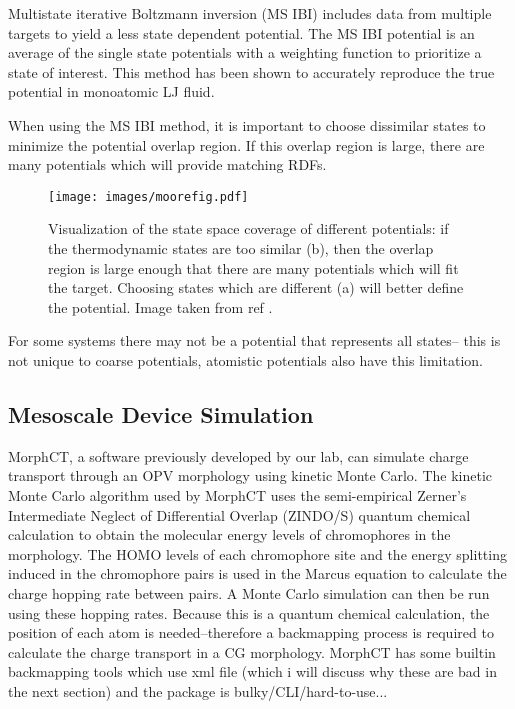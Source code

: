 Multistate iterative Boltzmann inversion (MS IBI) includes data from multiple targets to yield a less state dependent potential\cite{Moore2014}.
The MS IBI potential is an average of the single state potentials with a weighting function to prioritize a state of interest.
This method has been shown to accurately reproduce the true potential in monoatomic LJ fluid.

When using the MS IBI method, it is important to choose dissimilar states to minimize the potential overlap region.
If this overlap region is large, there are many potentials which will provide matching RDFs.

\begin{wrapfigure}{L}{0.5\linewidth}
    \centering
    \texttt{[image: images/moorefig.pdf]}
    \caption{Visualization of the state space coverage of different potentials: if the thermodynamic states are too similar (b), then the overlap region is large enough that there are many potentials which will fit the target. Choosing states which are different (a) will better define the potential. Image taken from ref \cite{Moore2014}.}
    \label{fig:lj}
\end{wrapfigure}

For some systems there may not be a potential that represents all states-- this is not unique to coarse potentials, atomistic potentials also have this limitation.

\subsection*{Mesoscale Device Simulation}

MorphCT, a software previously developed by our lab, can simulate charge transport through an OPV morphology using kinetic Monte Carlo\cite{Miller2018a,MorphCT,morphct2.2}.
The kinetic Monte Carlo algorithm used by MorphCT uses the semi-empirical Zerner's Intermediate Neglect of Differential Overlap (ZINDO/S) quantum chemical calculation to obtain the molecular energy levels of chromophores in the morphology.
The HOMO levels of each chromophore site and the energy splitting induced in the chromophore pairs is used in the Marcus equation to calculate the charge hopping rate between pairs.
A Monte Carlo simulation can then be run using these hopping rates.
Because this is a quantum chemical calculation, the position of each atom is needed--therefore a backmapping process is required to calculate the charge transport in a CG morphology.
MorphCT has some builtin backmapping tools which use xml file (which i will discuss why these are bad in the next section) and the package is bulky/CLI/hard-to-use...

